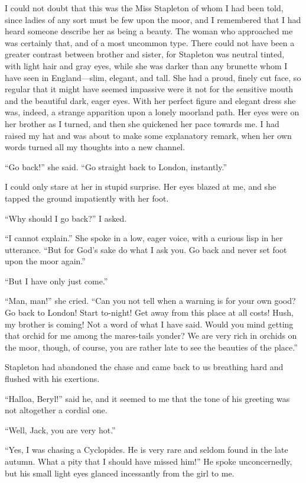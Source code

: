 \documentclass[paper=a5,BCOR=7mm,twoside,DIV=calc,12pt,usegeometry,openany,chapterprefix,endperiod,headings=big]{scrbook} %
\begin{document}
I could not doubt that this was the Miss Stapleton of whom I had been told, since ladies of any sort must be few upon the moor, and I remembered that I had heard someone describe her as being a beauty. The woman who approached me was certainly that, and of a most uncommon type. There could not have been a greater contrast between brother and sister, for Stapleton was neutral tinted, with light hair and gray eyes, while she was darker than any brunette whom I have seen in England---slim, elegant, and tall. She had a proud, finely cut face, so regular that it might have seemed impassive were it not for the sensitive mouth and the beautiful dark, eager eyes. With her perfect figure and elegant dress she was, indeed, a strange apparition upon a lonely moorland path. Her eyes were on her brother as I turned, and then she quickened her pace towards me. I had raised my hat and was about to make some explanatory remark, when her own words turned all my thoughts into a new channel.

\enquote{Go back!} she said. \enquote{Go straight back to London, instantly.}

I could only stare at her in stupid surprise. Her eyes blazed at me, and she tapped the ground impatiently with her foot.

\enquote{Why should I go back?} I asked.

\enquote{I cannot explain.} She spoke in a low, eager voice, with a curious lisp in her utterance. \enquote{But for God's sake do what I ask you. Go back and never set foot upon the moor again.}

\enquote{But I have only just come.}

\enquote{Man, man!} she cried. \enquote{Can you not tell when a warning is for your own good? Go back to London! Start to-night! Get away from this place at all costs! Hush, my brother is coming! Not a word of what I have said. Would you mind getting that orchid for me among the mares-tails yonder? We are very rich in orchids on the moor, though, of course, you are rather late to see the beauties of the place.}

Stapleton had abandoned the chase and came back to us breathing hard and flushed with his exertions.

\enquote{Halloa, Beryl!} said he, and it seemed to me that the tone of his greeting was not altogether a cordial one.

\enquote{Well, Jack, you are very hot.}

\enquote{Yes, I was chasing a Cyclopides. He is very rare and seldom found in the late autumn. What a pity that I should have missed him!} He spoke unconcernedly, but his small light eyes glanced incessantly from the girl to me.
\end{document}
